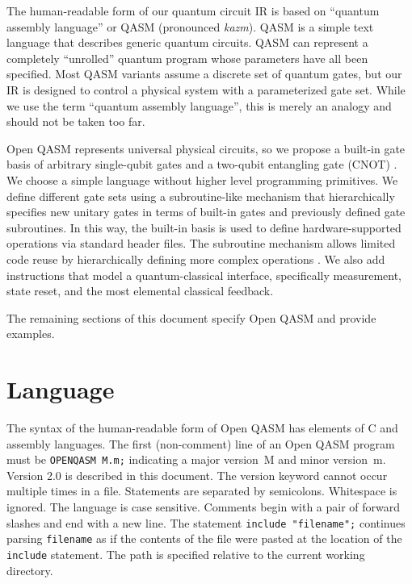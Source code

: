 \documentclass[USenglish,12pt,fleqn]{article} %
\newcommand*{\code}{\texttt}
\begin{document}
The human-readable form of our quantum circuit IR is based on ``quantum assembly language'' \cite{qasm2circ,qasmtools,svore06,quale,dousti16} or QASM (pronounced {\it kazm}). QASM is a simple text language that describes generic quantum circuits. QASM can represent a completely “unrolled” quantum program whose parameters have all been specified. Most QASM variants assume a discrete set of quantum gates, but our IR is designed to control a physical system with a parameterized gate set. While we use the term ``quantum assembly language'', this is merely an analogy and should not be taken too far.

Open QASM represents universal physical circuits, so we propose a built-in gate basis of arbitrary single-qubit gates and a two-qubit entangling gate (CNOT) \cite{barenco95}. We choose a simple language without higher level programming primitives. We define different gate sets using a subroutine-like mechanism that hierarchically specifies new unitary gates in terms of built-in gates and previously defined gate subroutines. In this way, the built-in basis is used to define hardware-supported operations via standard header files. The subroutine mechanism allows limited code reuse by hierarchically defining more complex operations \cite{scaffold,dousti16}. We also add instructions that model a quantum-classical interface, specifically measurement, state reset, and the most elemental classical feedback.

The remaining sections of this document specify Open QASM and provide examples.

\section{Language}\label{sec:spec}

The syntax of the human-readable form of Open QASM has elements of C and assembly languages. The first (non-comment) line of an Open QASM program must be \code{OPENQASM M.m;} indicating a major version~M and minor version~m. Version 2.0 is described in this document. The version keyword cannot occur multiple times in a file. Statements are separated by semicolons. Whitespace is ignored. The language is case sensitive. Comments begin with a pair of forward slashes and end with a new line. The statement \code{include "filename";} continues parsing \code{filename} as if the contents of the file were pasted at the location of the \code{include} statement. The path is specified relative to the current working directory.
\end{document}
